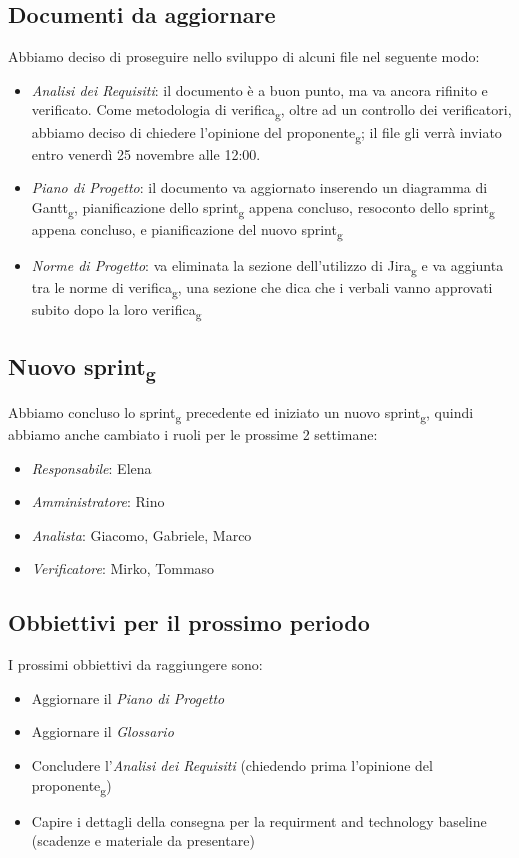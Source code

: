 \subsection{Documenti da aggiornare}
Abbiamo deciso di proseguire nello sviluppo di alcuni file nel seguente modo:
\begin{itemize}
	\item \textit{\textit{Analisi dei Requisiti}}: il documento è a buon punto, ma va ancora rifinito e verificato. Come metodologia di verifica\textsubscript{g}, oltre ad un controllo dei verificatori, abbiamo deciso di chiedere l'opinione del proponente\textsubscript{g}; il file gli verrà inviato entro venerdì 25 novembre alle 12:00.
	\item \textit{\textit{Piano di Progetto}}: il documento va aggiornato inserendo un diagramma di Gantt\textsubscript{g}, pianificazione dello sprint\textsubscript{g} appena concluso, resoconto dello sprint\textsubscript{g} appena concluso, e pianificazione del nuovo sprint\textsubscript{g}
	\item \textit{\textit{Norme di Progetto}}: va eliminata la sezione dell'utilizzo di Jira\textsubscript{g} e va aggiunta tra le norme di verifica\textsubscript{g}, una sezione che dica che i verbali vanno approvati subito dopo la loro verifica\textsubscript{g}
\end{itemize}

\subsection{Nuovo sprint\textsubscript{g}}
Abbiamo concluso lo sprint\textsubscript{g} precedente ed iniziato un nuovo sprint\textsubscript{g}, quindi abbiamo anche cambiato i ruoli per le prossime 2 settimane:
\begin{itemize}
\item \textit{Responsabile}: Elena
\item \textit{Amministratore}: Rino
\item \textit{Analista}: Giacomo, Gabriele, Marco
\item \textit{Verificatore}: Mirko, Tommaso
\end{itemize}

\subsection{Obbiettivi per il prossimo periodo}
I prossimi obbiettivi da raggiungere sono:
\begin{itemize}
\item Aggiornare il \textit{Piano di Progetto}
\item Aggiornare il \textit{Glossario}
\item Concludere l'\textit{Analisi dei Requisiti} (chiedendo prima l'opinione del proponente\textsubscript{g})
\item Capire i dettagli della consegna per la requirment and technology baseline (scadenze e materiale da presentare)
\end{itemize}

